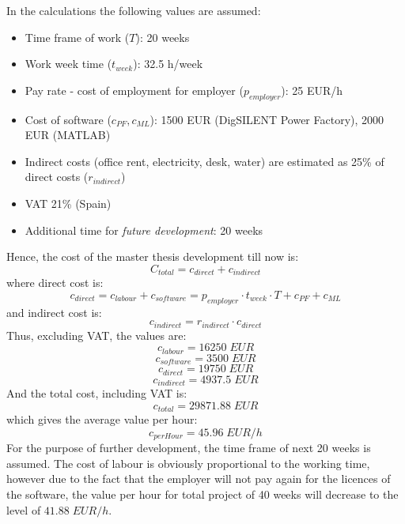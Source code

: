 \documentclass[12pt]{report} %
\begin{document}
In the calculations the following values are assumed:
\begin{itemize}
	\item Time frame of work ($T$): 20 weeks
	\item Work week time ($t_{week}$): 32.5 h/week
	\item Pay rate - cost of employment for employer ($p_{employer}$): 25 EUR/h
	\item Cost of software ($c_{PF}, c_{ML}$): 1500 EUR (DigSILENT Power Factory), 2000 EUR (MATLAB)
	\item Indirect costs (office rent, electricity, desk, water) are estimated as 25\% of direct costs ($r_{indirect}$)
	\item VAT 21\% (Spain)
	\item Additional time for \textit{future development}: 20 weeks
\end{itemize}

Hence, the cost of the master thesis development till now is:
$$C_{total} = c_{direct}+c_{indirect}$$
where direct cost is:
$$c_{direct} = c_{labour} + c_{software} = p_{employer} \cdot t_{week} \cdot T + c_{PF} + c_{ML}$$
and indirect cost is:
$$c_{indirect} = r_{indirect} \cdot c_{direct}$$
Thus, excluding VAT, the values are:
$$c_{labour} = 16250\; EUR$$
$$c_{software} = 3500\; EUR $$
$$c_{direct} = 19750\; EUR $$
$$c_{indirect} = 4937.5\; EUR $$
And the total cost, including VAT is:
$$c_{total}=29871.88\; EUR$$
which gives the average value per hour:
$$c_{perHour}=45.96\; EUR/h$$
For the purpose of further development, the time frame of next 20 weeks is assumed. The cost of labour is obviously proportional to the working time, however due to the fact that the employer will not pay again for the licences of the software, the value per hour for total project of 40 weeks will decrease to the level of $41.88\; EUR/h$.





\end{document}
